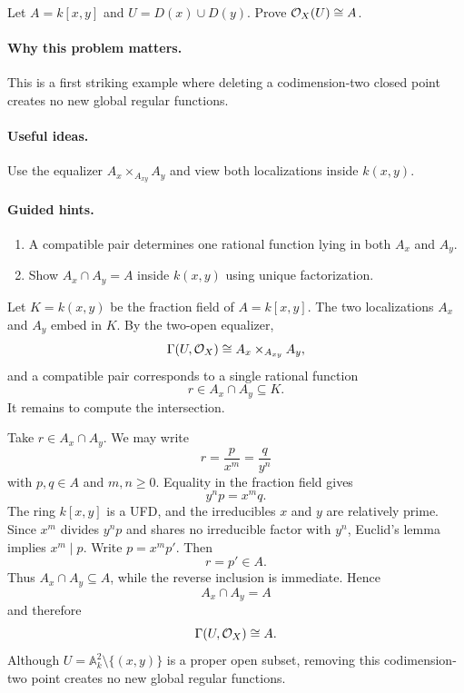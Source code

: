\begin{problem}\label{prob:vi17-p12}
Let $A=k[x,y]$ and $U=D(x)\cup D(y)$.  Prove $\mathcal O_X(U)\cong A$.
\end{problem}

\ifdefined\FullProblemDossiers
\paragraph{Why this problem matters.}
This is a first striking example where deleting a codimension-two closed point creates no new global regular functions.

\paragraph{Useful ideas.}
Use the equalizer $A_x\times_{A_{xy}}A_y$ and view both localizations inside $k(x,y)$.

\paragraph{Guided hints.}
\begin{enumerate}
\item A compatible pair determines one rational function lying in both $A_x$ and $A_y$.
\item Show $A_x\cap A_y=A$ inside $k(x,y)$ using unique factorization.
\end{enumerate}

\begin{solution}
Let $K=k(x,y)$ be the fraction field of $A=k[x,y]$.  The two localizations $A_x$ and $A_y$ embed in $K$.  By the two-open equalizer,
\[
\Gamma(U,\mathcal O_X)
\cong
A_x\times_{A_{xy}}A_y,
\]
and a compatible pair corresponds to a single rational function
\[
r\in A_x\cap A_y\subseteq K.
\]
It remains to compute the intersection.

Take $r\in A_x\cap A_y$.  We may write
\[
r=\frac{p}{x^m}=\frac{q}{y^n}
\]
with $p,q\in A$ and $m,n\ge0$.  Equality in the fraction field gives
\[
y^n p=x^m q.
\]
The ring $k[x,y]$ is a UFD, and the irreducibles $x$ and $y$ are relatively prime.  Since $x^m$ divides $y^np$ and shares no irreducible factor with $y^n$, Euclid's lemma implies $x^m\mid p$.  Write $p=x^m p'$.  Then
\[
r=p'\in A.
\]
Thus $A_x\cap A_y\subseteq A$, while the reverse inclusion is immediate.  Hence
\[
A_x\cap A_y=A
\]
and therefore
\[
\Gamma(U,\mathcal O_X)\cong A.
\]
Although $U=\mathbb A^2_k\setminus\{(x,y)\}$ is a proper open subset, removing this codimension-two point creates no new global regular functions.
\end{solution}



